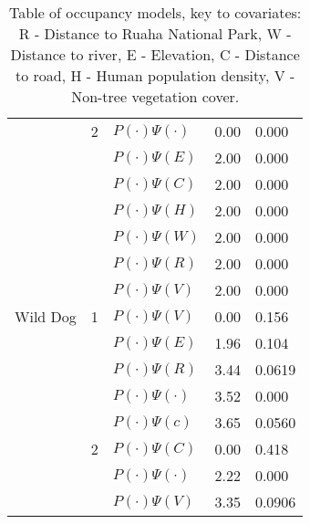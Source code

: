 \begin{table}[!h]
\begin{center}
\begin{tabular}{l l l l l}
			& 2		&$P(\cdot)\Psi(\cdot)$		& 	0.00		&0.000\\	
			& 		&$P(\cdot)\Psi(E)$			&	2.00		&0.000\\	
			& 		&$P(\cdot)\Psi(C)$			& 	2.00		&0.000\\	
			& 		&$P(\cdot)\Psi(H)$			&	2.00		&0.000\\	
			& 		&$P(\cdot)\Psi(W)$			&	2.00		&0.000\\	
			& 		&$P(\cdot)\Psi(R)$			&	2.00		&0.000\\	
			& 		&$P(\cdot)\Psi(V)$			&	2.00		&0.000\\	
	Wild Dog& 1		&$P(\cdot)\Psi(V)$			& 	0.00		&0.156\\	
			& 		&$P(\cdot)\Psi(E)$			&	1.96		&0.104\\	
			& 		&$P(\cdot)\Psi(R)$			& 	3.44		&0.0619\\	
			& 		&$P(\cdot)\Psi(\cdot)$		&	3.52		&0.000\\	
			& 		&$P(\cdot)\Psi(c)$			&	3.65		&0.0560\\	
			& 2		&$P(\cdot)\Psi(C)$			& 	0.00		&0.418\\	
			& 		&$P(\cdot)\Psi(\cdot)$		&	2.22		&0.000\\	
			& 		&$P(\cdot)\Psi(V)$			& 	3.35		&0.0906\\	
			\hline \hline						
		\end{tabular}
		\caption{Table of occupancy models, key to covariates: R - Distance to Ruaha National Park, W - Distance to river, E - Elevation, C - Distance to road, H - Human population density, V - Non-tree vegetation cover.}
	\label{table:Occu_models}
	\end{center}
\end{table}

